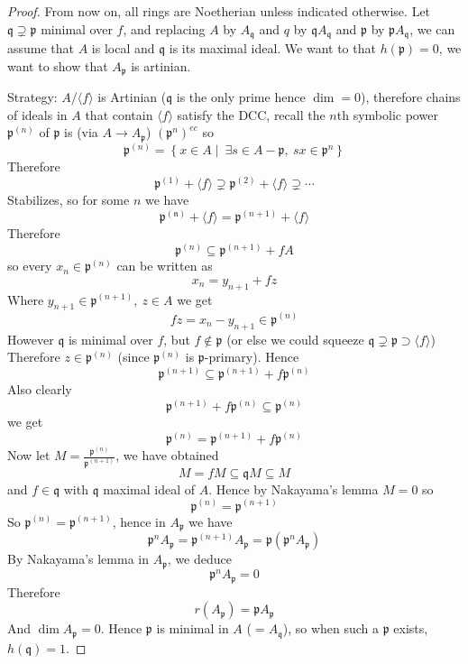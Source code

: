 \documentclass[11pt,a4paper]{article}
\theoremstyle{definition}
\theoremstyle{plain}
\theoremstyle{remark}
\renewcommand{\set}[1]{\left\{ #1 \right\}}
\newcommand{\angles}[1]{\langle #1 \rangle}
\begin{document}
\begin{proof}
    From now on, all rings are Noetherian unless indicated otherwise. Let $\mathfrak{q} \supsetneq \mathfrak{p}$ minimal over $f$, and replacing $A$ by $A_\mathfrak{q}$
    and $q$ by $\mathfrak{q} A_\mathfrak{q}$ and $\mathfrak{p}$ by $\mathfrak{p} A_\mathfrak{q}$, we can assume that $A$ is local and $\mathfrak{q}$ is its maximal ideal. 
    We want to that $h(\mathfrak{p}) = 0$, we want to show that $A_\mathfrak{p}$ is artinian.

    Strategy: $A/\angles{f}$ is Artinian ($\mathfrak{q}$ is the only prime hence $\dim = 0$), therefore chains of ideals in $A$ that contain $\angles{f}$ satisfy the DCC, recall the $n$th symbolic power $\mathfrak{p}^{(n)}$ of $\mathfrak{p}$ 
    is (via $A \to A_\mathfrak{p}$) $(\mathfrak{p}^n)^{ec}$ so 
    $$\mathfrak{p}^{(n)} = \set{x \in A \mid \ \exists s \in A - \mathfrak{p}, \ sx \in \mathfrak{p}^n}$$
    Therefore 
    $$\mathfrak{p}^{(1)} + \angles{f} \supsetneq \mathfrak{p}^{(2)} + \angles{f} \supsetneq \cdots$$
    Stabilizes, so for some $n$ we have 
    $$\mathfrak{p^{(n)}} + \angles{f} = \mathfrak{p}^{(n+1)} + \angles{f}$$
    Therefore 
    $$\mathfrak{p}^{(n)} \subseteq \mathfrak{p}^{(n+1)} + fA$$
    so every $x_n \in \mathfrak{p}^{(n)}$ can be written as 
    $$x_n = y_{n+1} + fz$$
    Where $y_{n+1} \in \mathfrak{p}^{(n+1)}, \ z \in A$ we get 
    $$fz = x_n - y_{n+1} \in \mathfrak{p}^{(n)}$$
    However $\mathfrak{q}$ is minimal over $f$, but $f \not\in \mathfrak{p}$ (or else we could squeeze $\mathfrak{q} \supsetneq \mathfrak{p} \supset \angles{f}$) 
    Therefore $z \in \mathfrak{p}^{(n)}$ (since $\mathfrak{p}^{(n)}$ is $\mathfrak{p}$-primary). Hence 
    $$\mathfrak{p}^{(n+1)} \subseteq \mathfrak{p}^{(n+1)} + f \mathfrak{p}^{(n)}$$
    Also clearly 
    $$\mathfrak{p}^{(n+1)} + f \mathfrak{p}^{(n)} \subseteq \mathfrak{p}^{(n)}$$
    we get 
    $$\mathfrak{p}^{(n)} = \mathfrak{p}^{(n+1)} + f \mathfrak{p}^{(n)}$$
    Now let $M = \frac{\mathfrak{p}^{(n)}}{\mathfrak{p}^{(n+1)}}$, we have obtained 
    $$M = fM \subseteq \mathfrak{q}M \subseteq M$$
    and $f \in \mathfrak{q}$ with $\mathfrak{q}$ maximal ideal of $A$. Hence by Nakayama's lemma $M = 0$ so 
    $$\mathfrak{p}^{(n)} = \mathfrak{p}^{(n+1)}$$
    So $\mathfrak{p}^{(n)} = \mathfrak{p}^{(n+1)}$, hence in $A_\mathfrak{p}$ we have 
    $$\mathfrak{p}^n A_\mathfrak{p} = \mathfrak{p}^{(n+1)} A_\mathfrak{p} = \mathfrak{p} (\mathfrak{p}^n A_\mathfrak{p})$$
    By Nakayama's lemma in $A_\mathfrak{p}$, we deduce 
    $$\mathfrak{p}^n A_\mathfrak{p} = 0$$
    Therefore 
    $$r(A_\mathfrak{p}) = \mathfrak{p}A_\mathfrak{p}$$
    And $\dim A_\mathfrak{p} = 0$. Hence $\mathfrak{p}$ is minimal in $A$ ($= A_\mathfrak{q}$), so when such a $\mathfrak{p}$ exists, 
    $h(\mathfrak{q}) = 1$. 
\end{proof}
\end{document}
